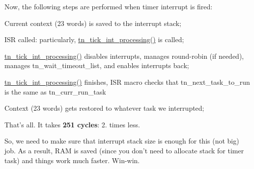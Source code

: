 Now, the following steps are performed when timer interrupt is fired\+:


\begin{DoxyItemize}
\item Current context (23 words) is saved to the interrupt stack;
\item I\+S\+R called\+: particularly, {\ttfamily \hyperlink{tn__sys_8h_a944d96c7a5d442d271115b6cb22a085b}{tn\+\_\+tick\+\_\+int\+\_\+processing()}} is called;
\item {\ttfamily \hyperlink{tn__sys_8h_a944d96c7a5d442d271115b6cb22a085b}{tn\+\_\+tick\+\_\+int\+\_\+processing()}} disables interrupts, manages round-\/robin (if needed), manages {\ttfamily tn\+\_\+wait\+\_\+timeout\+\_\+list}, and enables interrupts back;
\item {\ttfamily \hyperlink{tn__sys_8h_a944d96c7a5d442d271115b6cb22a085b}{tn\+\_\+tick\+\_\+int\+\_\+processing()}} finishes, I\+S\+R macro checks that {\ttfamily tn\+\_\+next\+\_\+task\+\_\+to\+\_\+run} is the same as {\ttfamily tn\+\_\+curr\+\_\+run\+\_\+task}
\item Context (23 words) gets restored to whatever task we interrupted;
\end{DoxyItemize}

That's all. It takes {\bfseries 251 cycles}\+: 2. times less.

So, we need to make sure that interrupt stack size is enough for this (not big) job. As a result, R\+A\+M is saved (since you don't need to allocate stack for timer task) and things work much faster. Win-\/win. 